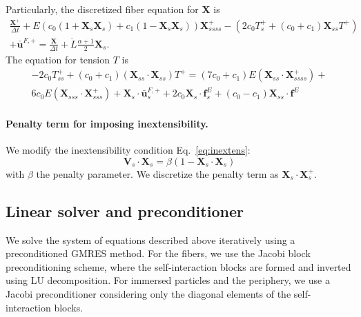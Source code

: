 \documentclass{article}
\newcommand{\XX}{\mathbf{X}}
\newcommand{\ubarFp}{\bar{\mathbf{u}}^{F,+}}
\newcommand{\ff}{\mathbf{f}}
\newcommand{\VV}{\mathbf{V}}
\begin{document}
Particularly, the discretized fiber equation for $\XX$ is
\begin{multline}
    \frac{\XX^+}{\Delta t} + E \left(c_0(1+\XX_s \XX_s) + c_1(1-\XX_s \XX_s)\right)\XX_{ssss}^+ - \left(2c_0 T_s^+ + (c_0 + c_1) \XX_{ss} T^+\right) \\ + \ubarFp
    = \frac{\XX}{\Delta t} + \dot{L}\frac{\alpha+1}{2}\XX_s.
\end{multline}
The equation for tension $T$ is
\begin{multline}
-2c_0T_{ss}^+ + (c_0 + c_1)(\XX_{ss}\cdot\XX_{ss})T^+ = (7c_0+c_1)E(\XX_{ss}\cdot\XX_{ssss}^+) + \\ 6c_0E(\XX_{sss}\cdot\XX_{sss}^+) + \XX_s \cdot \ubarFp_s + 2c_0\XX_s\cdot \ff^E_s + (c_0 - c_1)\XX_{ss}\cdot \ff^E
\end{multline}

\paragraph*{Penalty term for imposing inextensibility.} We modify the inextensibility condition Eq.~\ref{eq:inextens}:
\begin{equation}
    \VV_s \cdot \XX_s  = \beta (1-\XX_s \cdot \XX_s)
\end{equation}
with $\beta$ the penalty parameter. We discretize the penalty term as $\XX_s \cdot \XX^+_s$.

\subsection{Linear solver and preconditioner}
We solve the system of equations described above iteratively using a preconditioned GMRES method. For the fibers, we use the Jacobi block preconditioning scheme, where the self-interaction blocks are formed and inverted using LU decomposition. For immersed particles and the periphery, we use a Jacobi preconditioner considering only the diagonal elements of the self-interaction blocks.
\end{document}
